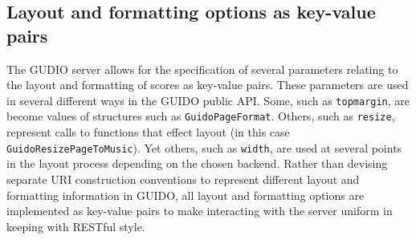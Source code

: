 \documentclass[11pt,a4paper]{article}
\newcommand{\guidosize}{7pt}
\begin{document}
\subsection{Layout and formatting options as key-value pairs}
The GUDIO server allows for the specification of several parameters relating to the layout and formatting of scores as key-value pairs.  These parameters are used in several different ways in the GUIDO public API.  Some, such as \verb=topmargin=, are become values of structures such as \verb=GuidoPageFormat=.  Others, such as \verb=resize=, represent calls to functions that effect layout (in this case \break \verb=GuidoResizePageToMusic=).  Yet others, such as \break \verb=width=, are used at several points in the layout process depending on the chosen backend.  Rather than devising separate URI construction conventions to represent different layout and formatting information in GUIDO, all layout and formatting options are implemented as key-value pairs to make interacting with the server uniform in keeping with RESTful style.\par

\end{document}

